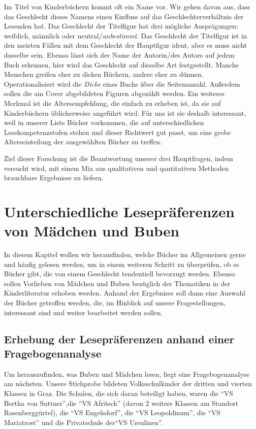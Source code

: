Im Titel von Kinderbüchern kommt oft ein Name vor. Wir gehen davon aus,
dass das Geschlecht dieses Namens einen Einfluss auf das
Geschlechterverhältnis der Lesenden hat. Das Geschlecht der Titelfigur
hat drei mögliche Ausprägungen: weiblich, männlich oder
neutral/\emph{unbestimmt}. Das Geschlecht der Titelfigur ist in den
meisten Fällen mit dem Geschlecht der Hauptfigur ident, aber es muss
nicht dasselbe sein. Ebenso lässt sich der Name der Autorin/des Autors
auf jedem Buch erkennen, hier wird das Geschlecht auf dieselbe Art
festgestellt. Manche Menschen greifen eher zu dicken Büchern, andere
eher zu dünnen. Operationalisiert wird die \emph{Dicke} eines Buchs über
die Seitenanzahl. Außerdem sollen die am Cover abgebildeten Figuren
abgezählt werden. Ein weiteres Merkmal ist die Altersempfehlung, die
einfach zu erheben ist, da sie auf Kinderbüchern üblicherweise angeführt
wird. Für uns ist sie deshalb interessant, weil in unserer Liste Bücher
vorkommen, die auf unterschiedlichen Lesekompetenzstufen stehen und
dieser Richtwert gut passt, um eine grobe Alterseinteilung der
ausgewählten Bücher zu treffen.

Ziel dieser Forschung ist die Beantwortung unserer drei Hauptfragen,
indem versucht wird, mit einem Mix aus qualitativen und qantitativen
Methoden brauchbare Ergebnisse zu liefern.

\chapter{Unterschiedliche Lesepräferenzen von Mädchen und Buben}

In diesem Kapitel wollen wir herausfinden, welche Bücher im Allgemeinen
gerne und häufig gelesen werden, um in einem weiteren Schritt zu
überprüfen, ob es Bücher gibt, die von einem Geschlecht tendentiell
bevorzugt werden. Ebenso sollen Vorlieben von Mädchen und Buben
bezüglich der Thematiken in der Kinderliteratur erhoben werden. Anhand
der Ergebnisse soll dann eine Auswahl der Bücher getroffen werden, die,
im Hinblick auf unsere Fragestellungen, interessant sind und weiter
bearbeitet werden sollen.

\section{Erhebung der Lesepräferenzen anhand einer Fragebogenanalyse}

Um herauszufinden, was Buben und Mädchen lesen, liegt eine
Fragebogenanalyse am nächsten. Unsere Stichprobe bildeten
Volksschulkinder der dritten und vierten Klassen in Graz. Die Schulen,
die sich daran beteiligt haben, waren die ``VS Bertha von Suttner'',die
``VS Afritsch'' (davon 2 weitere Klassen am Standort Rosenberggürtel),
die ``VS Engelsdorf'', die ``VS Leopoldinum'', die ``VS Mariatrost'' und
die Privatschule der``VS Ursulinen''.

